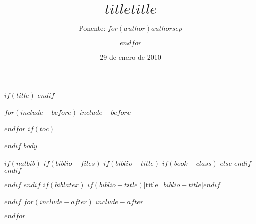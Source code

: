 \documentclass[$if(fontsize)$$fontsize$,$endif$$if(handout)$handout,$endif$$if(beamer)$ignorenonframetext,$endif$]{$documentclass$}
\title[$shorttitle$]{$title$}
\title{$title$}
\author[$author$]{Ponente: $for(author)$$author$$sep$ \and $endfor$}
\date{29 de enero de 2010}
\institute[Universidad de La Laguna]{
Entidades participantes en el curso: 

\begin{minipage}{8em}\vspace{0.5cm}
\begin{center}
        \texttt{[image: ../assets/img/logo\_ULL\_color.png]}
\end{center}
\end{minipage}
\begin{minipage}{35em}\vspace{0.5cm}
\begin{center}
      \texttt{[image: ../assets/img/logo\_Fundaciongeneral\_color.png]}
\end{center}
\end{minipage}
\begin{minipage}{8em}\vspace{0.5cm}
\begin{center}
        \texttt{[image: ../assets/img/logo\_istac.jpg]}
\end{center}
\end{minipage}

}
\date{}
\begin{document}
$if(title)$
\frame{\titlepage}
$endif$

$for(include-before)$
$include-before$

$endfor$
$if(toc)$
\begin{frame}
\tableofcontents[hideallsubsections]
\end{frame}

$endif$
$body$

$if(natbib)$
$if(biblio-files)$
$if(biblio-title)$
$if(book-class)$
\renewcommand\bibname{$biblio-title$}
$else$
\renewcommand\refname{$biblio-title$}
$endif$
$endif$


$endif$
$endif$
$if(biblatex)$
\printbibliography$if(biblio-title)$[title=$biblio-title$]$endif$

$endif$
$for(include-after)$
$include-after$

$endfor$
\end{document}
